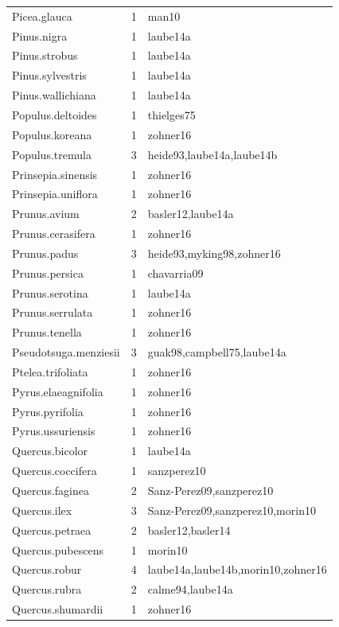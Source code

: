 \documentclass{article}
\begin{document}
\begin{footnotesize}
\begin{longtable}{|p{}|p{}|p{}|}
  Picea.glauca &   1 & man10 \\ 
  Pinus.nigra &   1 & laube14a \\ 
  Pinus.strobus &   1 & laube14a \\ 
  Pinus.sylvestris &   1 & laube14a \\ 
  Pinus.wallichiana &   1 & laube14a \\ 
  Populus.deltoides &   1 & thielges75 \\ 
  Populus.koreana &   1 & zohner16 \\ 
  Populus.tremula &   3 & heide93,laube14a,laube14b \\ 
  Prinsepia.sinensis &   1 & zohner16 \\ 
  Prinsepia.uniflora &   1 & zohner16 \\ 
  Prunus.avium &   2 & basler12,laube14a \\ 
  Prunus.cerasifera &   1 & zohner16 \\ 
  Prunus.padus &   3 & heide93,myking98,zohner16 \\ 
  Prunus.persica &   1 & chavarria09 \\ 
  Prunus.serotina &   1 & laube14a \\ 
  Prunus.serrulata &   1 & zohner16 \\ 
  Prunus.tenella &   1 & zohner16 \\ 
  Pseudotsuga.menziesii &   3 & guak98,campbell75,laube14a \\ 
  Ptelea.trifoliata &   1 & zohner16 \\ 
  Pyrus.elaeagnifolia &   1 & zohner16 \\ 
  Pyrus.pyrifolia &   1 & zohner16 \\ 
  Pyrus.ussuriensis &   1 & zohner16 \\ 
  Quercus.bicolor &   1 & laube14a \\ 
  Quercus.coccifera &   1 & sanzperez10 \\ 
  Quercus.faginea &   2 & Sanz-Perez09,sanzperez10 \\ 
  Quercus.ilex &   3 & Sanz-Perez09,sanzperez10,morin10 \\ 
  Quercus.petraea &   2 & basler12,basler14 \\ 
  Quercus.pubescens &   1 & morin10 \\ 
  Quercus.robur &   4 & laube14a,laube14b,morin10,zohner16 \\ 
  Quercus.rubra &   2 & calme94,laube14a \\ 
  Quercus.shumardii &   1 & zohner16 \\ 

\end{longtable}
\end{footnotesize}
\end{document}
